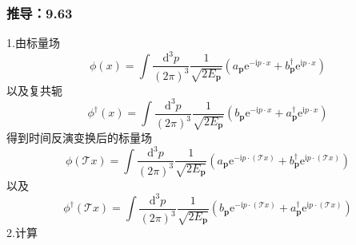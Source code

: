 \subsubsection{推导：9.63}
1.由标量场
\begin{equation}
    \phi (x)=\int{\frac{\mathrm{d}^3p}{\left( 2\pi \right) ^3}\frac{1}{\sqrt{2E_{\mathbf{p}}}}\left( a_{\mathbf{p}}\mathrm{e}^{-\mathrm{i}p\cdot x}+b_{\mathbf{p}}^{\dagger}\mathrm{e}^{\mathrm{i}p\cdot x} \right)}
\end{equation}
以及复共轭
\begin{equation}
    \phi ^{\dagger}(x)=\int{\frac{\mathrm{d}^3p}{\left( 2\pi \right) ^3}}\frac{1}{\sqrt{2E_{\mathbf{p}}}}\left( b_{\mathbf{p}}\mathrm{e}^{-\mathrm{i}p\cdot x}+a_{\mathbf{p}}^{\dagger}\mathrm{e}^{\mathrm{i}p\cdot x} \right) 
\end{equation}
得到时间反演变换后的标量场
\begin{equation}
    \phi (\mathcal{T} x)=\int{\frac{\mathrm{d}^3p}{\left( 2\pi \right) ^3}\frac{1}{\sqrt{2E_{\mathbf{p}}}}\left( a_{\mathbf{p}}\mathrm{e}^{-\mathrm{i}p\cdot \left( \mathcal{T} x \right)}+b_{\mathbf{p}}^{\dagger}\mathrm{e}^{\mathrm{i}p\cdot \left( \mathcal{T} x \right)} \right)}
\end{equation}
以及
\begin{equation}
    \phi ^{\dagger}(\mathcal{T} x)=\int{\frac{\mathrm{d}^3p}{\left( 2\pi \right) ^3}}\frac{1}{\sqrt{2E_{\mathbf{p}}}}\left( b_{\mathbf{p}}\mathrm{e}^{-\mathrm{i}p\cdot \left( \mathcal{T} x \right)}+a_{\mathbf{p}}^{\dagger}\mathrm{e}^{\mathrm{i}p\cdot \left( \mathcal{T} x \right)} \right) 
\end{equation}
2.计算
